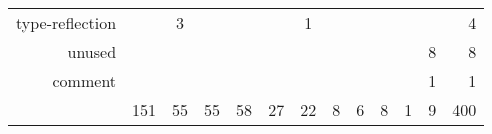 \begin{table*}[t]
\begin{tabular}{r|ccccccccccc|r}
        \rowcolor{verylightgray}
                          type-reflection &       &   3 &     &      &     &   1 &    &     &    &    &    &    4 \\
                                   unused &       &     &     &      &     &     &    &     &    &    &  8 &    8 \\
        \rowcolor{verylightgray}
                                  comment &       &     &     &      &     &     &    &     &    &    &  1 &    1 \\ \hline
                                       {} &   151 &  55 &  55 &   58 &  27 &  22 &  8 &   6 &  8 &  1 &  9 &  400 \\
    \end{tabular}
\end{table*}